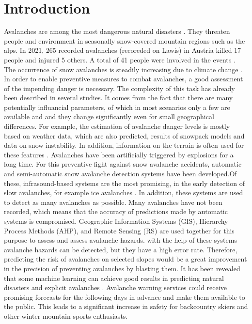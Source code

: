 \documentclass[12pt,a4paper]{article}
\title{\titlename}
\author{ \authorname\\ \scriptsize \authormail \\ \scriptsize \address }
\author{ \authorid\\ \scriptsize \address }
\date{\exposedate}
\begin{document}



\maketitle

\tableofcontents
\newpage

\section{Introduction}
Avalanches are among the most dangerous natural disasters \autocite{Lawine:2019}. They threaten people and environment in seasonally snow-covered mountain regions such as the alps. In 2021, 265 recorded avalanches (recoreded on Lawis) in Austria killed 17 people and injured 5 others. A total of 41 people were involved in the events \autocite[]{Lawis:2022}. The occurrence of snow avalanches is steadily increasing due to climate change \autocite{Martin:2001} \autocite[]{Tiwari:2021} \autocite{Bahram:2019}.  In order to enable preventive measures to combat avalanches, a good assessment of the impending danger is necessary. The complexity of this task has already been described in several studies. It comes from the fact that there are many potentially influancial parameters, of which in most scenarios only a few are available and and they change significantly even for small geographical differences. For example, the estimation of avalanche danger levels is mostly based on weather data, which are also predicted, results of snowpack models and data on snow instability. In addition, information on the terrain is often used for these features \autocite{Bahram:2019}. Avalanches have been artificially triggered by explosions for a long time. For this preventive fight against snow avalanche accidents, automatic and semi-automatic snow avalanche detection systems have been developed.Of these, infrasound-based systems are the most promising, in the early detection of slow avalanches, for example ice avalanches \autocite{THURING201560} \autocite{Lawine:2019}. In addition, these systems are used to detect as many avalanches as possible. Many avalanches have not been recorded, which means that the accuracy of predictions made by automatic systems is compromised. Geographic Information Systems (GIS), Hierarchy Process Methods (AHP), and Remote Sensing (RS) are used together for this purpose to assess and assess avalanche hazards. with the help of these systems avalanche hazards can be detected, but they have a high error rate. Therefore, predicting the risk of avalanches on selected slopes would be a great improvement in the precision of preventing avalanches by blasting them.  It has been revealed that some machine learning can achieve good results in predicting natural disasters and explicit avalanches \autocite[]{Martin:2001} \autocite[]{Tiwari:2021} \autocite{Bahram:2019}. Avalanche warning services could receive promising forecasts for the following days in advance and make them available to the public. This leads to a significant increase in safety for backcountry skiers and other winter mountain sports enthusiasts.
\end{document}
